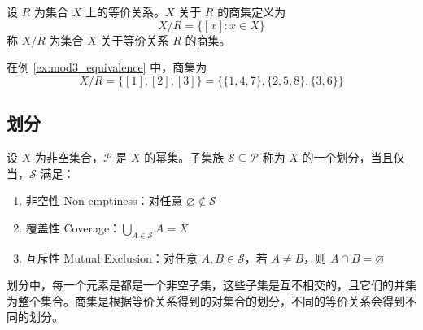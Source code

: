\begin{definition}
    设 $ R $ 为集合 $ X $ 上的等价关系。$ X $ 关于 $ R $ 的商集定义为
    \[
        X/R = \{[x] : x\in X\}
    \]
    称 $ X/R $ 为集合 $ X $ 关于等价关系 $ R $ 的商集。
    
\end{definition}
\begin{note}
    在例 \ref{ex:mod3_equivalence} 中，商集为
    \[
        X/R = \{[1], [2], [3]\} = \{\{1,4,7\}, \{2,5,8\}, \{3,6\}\}
    \]
\end{note}
\vspace{1em}

\subsection{划分}
\begin{definition}[划分 Partition]
    设 $ X $ 为非空集合，$ \mathcal{P} $ 是 $ X $ 的幂集。子集族 $\mathcal{S}\subseteq \mathcal{P}$ 称为 $ X $ 的一个划分，当且仅当，$ \mathcal{S} $ 满足：
    \begin{enumerate}
        \item 非空性 Non-emptiness：对任意 $ \varnothing \notin \mathcal{S} $
        \item 覆盖性 Coverage：$ \bigcup_{A\in \mathcal{S}} A = X $
        \item 互斥性 Mutual Exclusion：对任意 $ A,B\in \mathcal{S} $，若 $ A\neq B $，则 $ A\cap B = \varnothing $
    \end{enumerate}
\end{definition}

\begin{note}
    划分中，每一个元素是都是一个非空子集，这些子集是互不相交的，且它们的并集为整个集合。商集是根据等价关系得到的对集合的划分，不同的等价关系会得到不同的划分。
\end{note}

\newpage